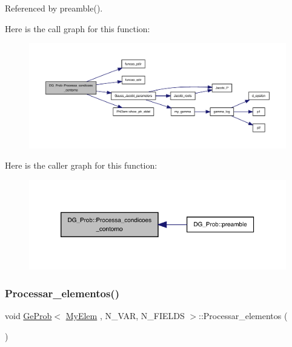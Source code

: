 Referenced by preamble().

Here is the call graph for this function\+:
\nopagebreak
\begin{figure}[H]
\begin{center}
\leavevmode
\includegraphics[width=350pt]{classDG__Prob_a7933929b9873b4e40fc5152bd746dcf3_cgraph}
\end{center}
\end{figure}
Here is the caller graph for this function\+:
\nopagebreak
\begin{figure}[H]
\begin{center}
\leavevmode
\includegraphics[width=320pt]{classDG__Prob_a7933929b9873b4e40fc5152bd746dcf3_icgraph}
\end{center}
\end{figure}
\mbox{\label{classGeProb_abe608186b9102498672c115584169d9a}} 
\subsubsection{\texorpdfstring{Processar\+\_\+elementos()}{Processar\_elementos()}}
{\footnotesize\ttfamily void \hyperlink{classGeProb}{Ge\+Prob}$<$ \hyperlink{DG__Prob_8h_a83cd887ced9a6587428f267e50cd4787}{My\+Elem} , N\+\_\+\+V\+AR, N\+\_\+\+F\+I\+E\+L\+DS $>$\+::Processar\+\_\+elementos (\begin{DoxyParamCaption}{ }\end{DoxyParamCaption})\hspace{0.3cm}{\ttfamily [inherited]}}



